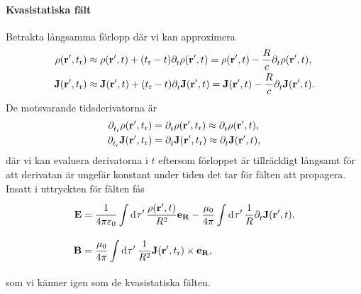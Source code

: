 \paragraph{Kvasistatiska fält}
Betrakta långsamma förlopp där vi kan approximera
\begin{align*}
	\rho(\vb{r}', t_{\text{r}})   &\approx \rho(\vb{r}', t) + (t_{\text{r}} - t)\partial_{t}^{}\rho(\vb{r}', t) = \rho(\vb{r}', t) - \frac{R}{c}\partial_{t}^{}\rho(\vb{r}', t), \\
	\vb{J}(\vb{r}', t_{\text{r}}) &\approx \vb{J}(\vb{r}', t) + (t_{\text{r}} - t)\partial_{t}^{}\vb{J}(\vb{r}', t) = \vb{J}(\vb{r}', t) - \frac{R}{c}\partial_{t}^{}\vb{J}(\vb{r}', t).
\end{align*}
De motsvarande tidsderivatorna är
\begin{align*}
	\partial_{t_{\text{r}}}^{}\rho(\vb{r}', t_{\text{r}})   &= \partial_{t}^{}\rho(\vb{r}', t_{\text{r}}) \approx \partial_{t}^{}\rho(\vb{r}', t), \\
	\partial_{t_{\text{r}}}^{}\vb{J}(\vb{r}', t_{\text{r}}) &= \partial_{t}^{}\vb{J}(\vb{r}', t_{\text{r}}) \approx \partial_{t}^{}\vb{J}(\vb{r}', t),
\end{align*}
där vi kan evaluera derivatorna i $t$ eftersom förloppet är tillräckligt långsamt för att derivatan är ungefär konstant under tiden det tar för fälten att propagera. Insatt i uttryckten för fälten fås
\begin{align*}
	\vb{E} &= \frac{1}{4\pi\varepsilon_{0}}\int\limits_{}^{}\dd[]{\tau'}\frac{\rho(\vb{r}', t)}{R^{2}}\vb{e}_{\vb{R}} - \frac{\mu_{0}}{4\pi}\int\limits_{}^{}\dd[]{\tau'}\frac{1}{R}\partial_{t}^{}\vb{J}(\vb{r}', t), \\
	\vb{B} &= \frac{\mu_{0}}{4\pi}\int\limits_{}^{}\dd[]{\tau'}\frac{1}{R^{2}}\vb{J}(\vb{r}', t_{\text{r}})\times\vb{e}_{\vb{R}},
\end{align*}
som vi känner igen som de kvasistatiska fälten.

